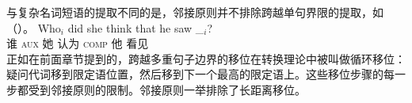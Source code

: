 与复杂名词短语的提取不同的是，邻接原则并不排除跨越单句界限的提取，如（）。
\ea
\gll Who$_i$ did she think that he saw \_$_i$?\\
谁 \textsc{aux} 她 认为 \textsc{comp} 他 看见\\
\z
正如在前面章节提到的，跨越多重句子边界的移位在转换理论中被叫做循环移位：疑问代词移到限定语位置，然后移到下一个最高的限定语上。这些移位步骤的每一步都受到邻接原则的限制。邻接原则一举排除了长距离移位。

